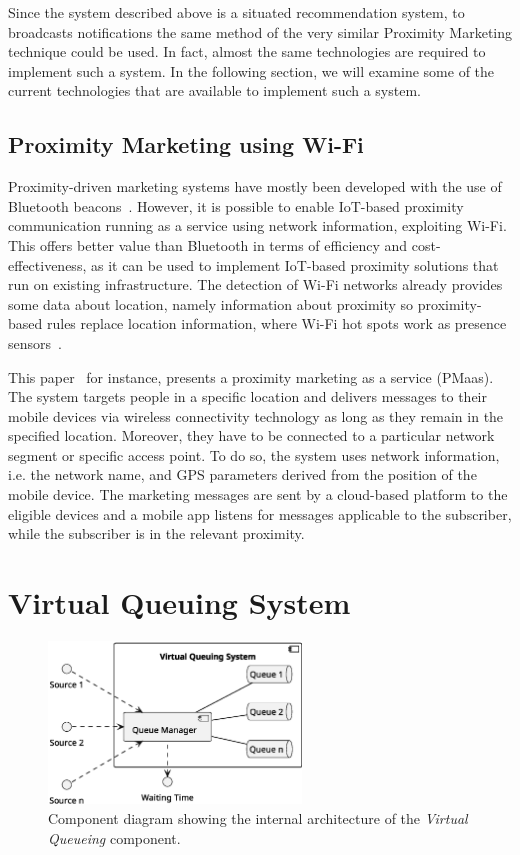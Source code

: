 Since the system described above is a situated recommendation system, to broadcasts notifications the same method of the very similar Proximity Marketing technique could be used.
In fact, almost the same technologies are required to implement such a system.
In the following section, we will examine some of the current technologies that are available to implement such a system.

\subsection{Proximity Marketing using Wi-Fi}\label{sec:situated-recommendation-system-technologies}
Proximity-driven marketing systems have mostly been developed with the use of Bluetooth beacons~\cite{mndebele2017iot}.
However, it is possible to enable IoT-based proximity communication running as a service using network information, exploiting Wi-Fi.
This offers better value than Bluetooth in terms of efficiency and cost-effectiveness, as it can be used to implement IoT-based proximity solutions that run on existing infrastructure.
The detection of Wi-Fi networks already provides some data about location, namely information about proximity so
proximity-based rules replace location information, where Wi-Fi hot spots work as presence sensors~\cite{dmitry2013network}.

This paper~\cite{mndebele2017iot} for instance, presents a proximity marketing as a service (PMaas).
The system targets people in a specific location and delivers messages to their mobile devices via wireless connectivity technology as long as they remain in the specified location.
Moreover, they have to be connected to a particular network segment or specific access point.
To do so, the system uses network information, i.e. the network name, and GPS parameters derived from the position of the mobile device.
The marketing messages are sent by a cloud-based platform to the eligible devices and a mobile app listens for messages
applicable to the subscriber, while the subscriber is in the relevant proximity.

\section{Virtual Queuing System}
\begin{figure}[H]
	\centering
	\includegraphics[width=0.6\textwidth]{img/virtual-queuing.eps}
	\caption{Component diagram showing the internal architecture of the \textit{Virtual Queueing} component.
	}
	\label{fig:virtual-queueing-arch}
\end{figure}

